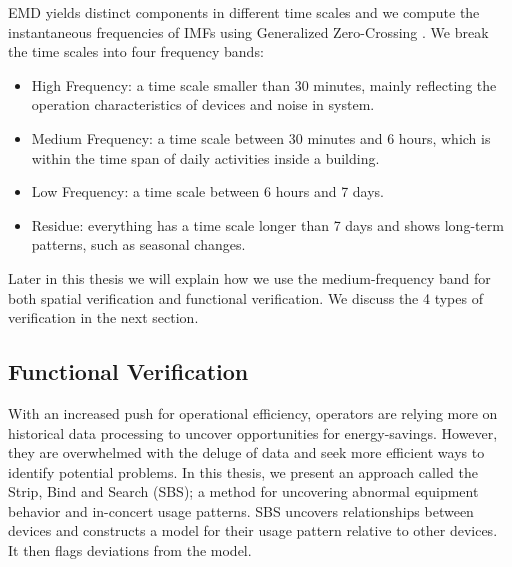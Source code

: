 EMD yields distinct components in different time scales and we compute the instantaneous frequencies \cite{IF} of IMFs using Generalized Zero-Crossing \cite{GZC}.  We break the time scales into four frequency bands:
\begin{itemize}
\item High Frequency: a time scale smaller than 30 minutes, mainly reflecting the operation characteristics of devices and noise in system. 
\item Medium Frequency: a time scale between 30 minutes and 6 hours, which is within the time span of daily activities inside a building.
\item Low Frequency: a time scale between 6 hours and 7 days. %
\item Residue: everything has a time scale longer than 7 days and shows long-term patterns, such as seasonal changes.
\end{itemize}

Later in this thesis we will explain how we use the medium-frequency band for both spatial verification and functional verification.  We discuss
the 4 types of verification in the next section.







\subsection{Functional Verification}%
With an increased push for operational efficiency, operators are relying more on historical data processing to uncover opportunities for energy-savings.
However, they are overwhelmed with the deluge of data and seek more efficient ways to identify potential problems.
In this thesis, we present an approach called the Strip, Bind and Search (SBS); a method for uncovering abnormal 
equipment behavior and in-concert usage patterns.
SBS uncovers relationships between devices and constructs a model for their usage pattern relative to other devices.
It then flags deviations from the model. 


